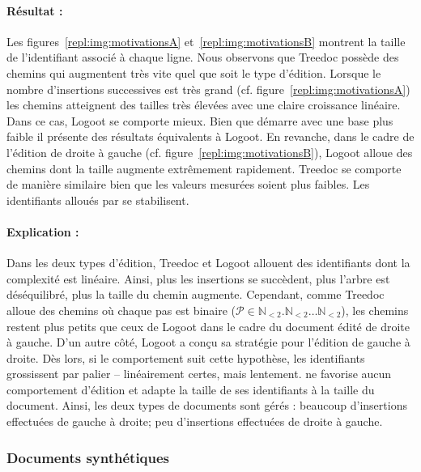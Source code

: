 \paragraph{Résultat :} Les figures~\ref{repl:img:motivationsA}
et~\ref{repl:img:motivationsB} montrent la taille de l'identifiant associé à
chaque ligne. Nous observons que Treedoc possède des chemins qui augmentent très
vite quel que soit le type d'édition. Lorsque le nombre d'insertions successives
est très grand (cf. figure~\ref{repl:img:motivationsA}) les chemins atteignent
des tailles très élevées avec une claire croissance linéaire. Dans ce cas,
Logoot se comporte mieux. Bien que \LSEQ démarre avec une base plus faible il
présente des résultats équivalents à Logoot. En revanche, dans le cadre de
l'édition de droite à gauche (cf. figure~\ref{repl:img:motivationsB}), Logoot
alloue des chemins dont la taille augmente extrêmement rapidement. Treedoc se
comporte de manière similaire bien que les valeurs mesurées soient plus
faibles. Les identifiants alloués par \LSEQ se stabilisent.


\paragraph{Explication :} Dans les deux types d'édition, Treedoc et Logoot
allouent des identifiants dont la complexité est linéaire. Ainsi, plus les
insertions se succèdent, plus l'arbre est déséquilibré, plus la taille du chemin
augmente. Cependant, comme Treedoc alloue des chemins où chaque pas est binaire
($\mathcal{P}\in \mathbb{N}_{<2}.\mathbb{N}_{<2}\ldots\mathbb{N}_{<2}$), les
chemins restent plus petits que ceux de Logoot dans le cadre du document édité
de droite à gauche. D'un autre côté, Logoot a conçu sa stratégie pour l'édition
de gauche à droite. Dès lors, si le comportement suit cette hypothèse, les
identifiants grossissent par palier -- linéairement certes, mais
lentement. \LSEQ ne favorise aucun comportement d'édition et adapte la taille de
ses identifiants à la taille du document. Ainsi, les deux types de documents
sont gérés : beaucoup d'insertions effectuées de gauche à droite; peu
d'insertions effectuées de droite à gauche.


\subsubsection{Documents synthétiques}

